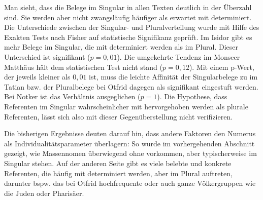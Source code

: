 Man sieht, dass die Belege im Singular in allen Texten deutlich in der Überzahl sind. Sie werden aber nicht zwangsläufig häufiger als erwartet mit  determiniert. Die Unterschiede zwischen der Singular- und Pluralverteilung wurde mit Hilfe des Exakten Tests nach Fisher auf statistische Signifikanz geprüft. Im Isidor gibt es mehr Belege im Singular, die mit  determiniert werden als im Plural. Dieser Unterschied ist signifikant ($p=0,01$). Die umgekehrte Tendenz im Monseer Matthäus hält dem statistischen Test nicht stand ($p=0,12$). Mit einem p-Wert,
der jeweils kleiner als $0,01$ ist, muss die leichte Affinität der Singularbelege zu  im Tatian bzw. der Pluralbelege bei Otfrid dagegen als signifikant eingestuft werden. Bei Notker ist das Verhältnis ausgeglichen ($p=1$). Die Hypothese, dass Referenten im
Singular wahrscheinlicher mit  hervorgehoben werden als plurale
Referenten, lässt sich also mit dieser Gegenüberstellung nicht verifizieren. 

Die bisherigen Ergebnisse deuten darauf hin, dass andere Faktoren den Numerus als Individualitätsparameter überlagern: So wurde im vorhergehenden Abschnitt gezeigt, wie Massennomen überwiegend ohne  vorkommen, aber typischerweise im Singular stehen. Auf der anderen Seite gibt es viele belebte und konkrete Referenten, die häufig mit  determiniert werden, aber im Plural auftreten, darunter bspw. das bei Otfrid hochfrequente   oder auch ganze Völkergruppen wie die Juden oder Pharisäer.

